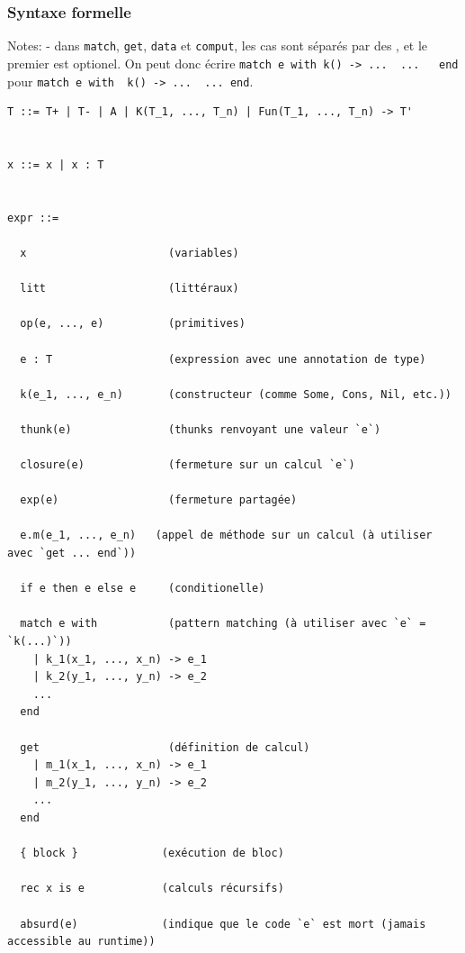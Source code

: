 \documentclass[12pt]{article}
\begin{document}
\hypertarget{syntaxe-formelle}{%
      \subsubsection*{Syntaxe formelle}\label{syntaxe-formelle}}

Notes: - dans \texttt{match}, \texttt{get}, \texttt{data} et
\texttt{comput}, les cas sont séparés par des \texttt{\textbar{}}, et le
premier est optionel. On peut donc écrire
\texttt{match\ e\ with\ k()\ -\textgreater{}\ ...\ \textbar{}\ ...\ \ \ end}
pour
\texttt{match\ e\ with\ \textbar{}\ k()\ -\textgreater{}\ ...\ \textbar{}\ ...\ end}.

\begin{verbatim}
T ::= T+ | T- | A | K(T_1, ..., T_n) | Fun(T_1, ..., T_n) -> T'


x ::= x | x : T 


expr ::= 

  x                      (variables)
    
  litt                   (littéraux) 
    
  op(e, ..., e)          (primitives)
  
  e : T                  (expression avec une annotation de type)
  
  k(e_1, ..., e_n)       (constructeur (comme Some, Cons, Nil, etc.))
  
  thunk(e)               (thunks renvoyant une valeur `e`)
  
  closure(e)             (fermeture sur un calcul `e`)
  
  exp(e)                 (fermeture partagée)
  
  e.m(e_1, ..., e_n)   (appel de méthode sur un calcul (à utiliser avec `get ... end`))
  
  if e then e else e     (conditionelle)
  
  match e with           (pattern matching (à utiliser avec `e` = `k(...)`)) 
    | k_1(x_1, ..., x_n) -> e_1
    | k_2(y_1, ..., y_n) -> e_2
    ...
  end
  
  get                    (définition de calcul)
    | m_1(x_1, ..., x_n) -> e_1
    | m_2(y_1, ..., y_n) -> e_2
    ...
  end
  
  { block }             (exécution de bloc)
  
  rec x is e            (calculs récursifs)
  
  absurd(e)             (indique que le code `e` est mort (jamais accessible au runtime))



\end{verbatim}
\end{document}
